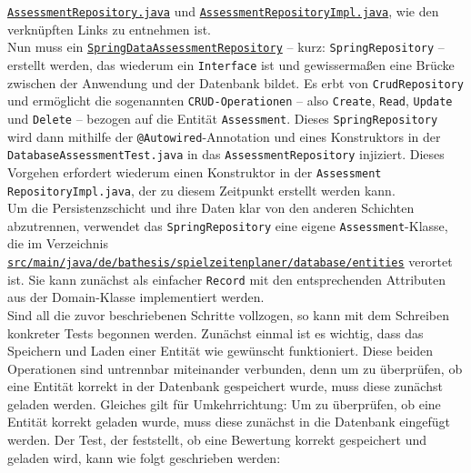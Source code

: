 \href{https://github.com/FlorianOhmes/bat_spielzeitenplaner/blob/fccaa502124b53ec672754dc262bb2d6ad1cd867/spielzeitenplaner/src/main/java/de/bathesis/spielzeitenplaner/services/repos/AssessmentRepository.java}{\texttt{AssessmentRepository.java}} 
und 
\href{https://github.com/FlorianOhmes/bat_spielzeitenplaner/blob/fccaa502124b53ec672754dc262bb2d6ad1cd867/spielzeitenplaner/src/main/java/de/bathesis/spielzeitenplaner/database/repoimpl/AssessmentRepositoryImpl.java}{\texttt{AssessmentRepositoryImpl.java}}, 
wie den verknüpften Links zu entnehmen ist. \\ 
Nun muss ein 
\href{https://github.com/FlorianOhmes/bat_spielzeitenplaner/blob/0a423a3298919d7206b87d381ecbbd66c6c54869/spielzeitenplaner/src/main/java/de/bathesis/spielzeitenplaner/database/springrepos/SpringDataAssessmentRepository.java}{\texttt{SpringDataAssessmentRepository}} 
-- kurz: \texttt{SpringRepository} -- erstellt werden, das wiederum ein 
\texttt{Interface} ist und gewissermaßen eine Brücke zwischen der Anwendung und 
der Datenbank bildet. Es erbt von \texttt{CrudRepository} und ermöglicht die 
sogenannten \texttt{CRUD-Operationen} -- also \texttt{Create}, \texttt{Read}, 
\texttt{Update} und \texttt{Delete} -- bezogen auf die Entität \texttt{Assessment}. 
Dieses \texttt{SpringRepository} wird dann mithilfe der 
\texttt{@Autowired}-Annotation und eines Konstruktors in der 
\texttt{DatabaseAssessmentTest.java} in das \texttt{AssessmentRepository} injiziert. 
Dieses Vorgehen erfordert wiederum einen Konstruktor in der 
\texttt{Assessment \linebreak RepositoryImpl.java}, der zu diesem Zeitpunkt erstellt 
werden kann. \\ 
Um die Persistenzschicht und ihre Daten klar von den anderen Schichten abzutrennen, 
verwendet das \texttt{SpringRepository} eine eigene \texttt{Assessment}-Klasse, die 
im Verzeichnis
\href{https://github.com/FlorianOhmes/bat_spielzeitenplaner/tree/main/spielzeitenplaner/src/main/java/de/bathesis/spielzeitenplaner/database/entities}{\texttt{src/main/java/de/bathesis/spielzeitenplaner/database/entities}}
verortet ist. Sie kann zunächst als einfacher \texttt{Record} mit den entsprechenden 
Attributen aus der Domain-Klasse implementiert werden. \\ 
Sind all die zuvor beschriebenen Schritte vollzogen, so kann mit dem Schreiben 
konkreter Tests begonnen werden. Zunächst einmal ist es wichtig, dass das Speichern 
und Laden einer Entität wie gewünscht funktioniert. Diese beiden Operationen sind 
untrennbar miteinander verbunden, denn um zu überprüfen, ob eine Entität korrekt in 
der Datenbank gespeichert wurde, muss diese zunächst geladen werden. Gleiches gilt für 
Umkehrrichtung: Um zu überprüfen, ob eine Entität korrekt geladen wurde, muss diese 
zunächst in die Datenbank eingefügt werden. Der Test, der feststellt, ob eine 
Bewertung korrekt gespeichert und geladen wird, kann wie folgt geschrieben werden: 

